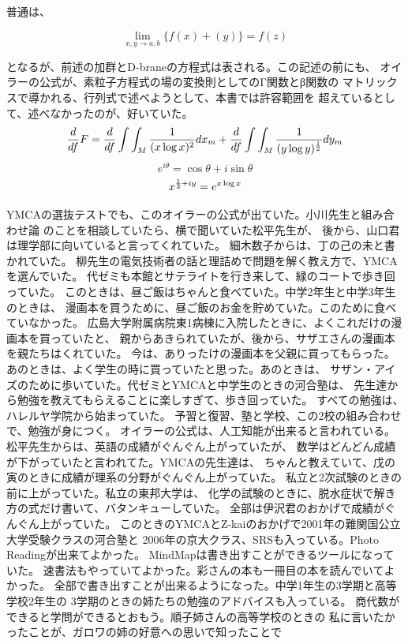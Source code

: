 \documentclass{jsarticle}
\begin{document}
普通は、

$$ \lim_{x,y\to a,b}\{{f(x) + (y)}\} = f(z) $$

となるが、前述の加群とD-braneの方程式は表される。この記述の前にも、
オイラーの公式が、素粒子方程式の場の変換則としてのΓ関数とβ関数の
マトリックスで導かれる、行列式で述べようとして、本書では許容範囲を
超えているとして、述べなかったのが、好いていた。
$$ {d \over df}F = {d \over df}\int\int_M{1 \over (x \log x)^2}dx_m 
+ {d \over df}\int\int_M{1 \over (y \log y)^{1 \over 2}}dy_m $$
$$ e^{i \theta} = \cos \theta + i \sin \theta $$
$$ x^{{1 \over 2} + iy} = e^{x \log x} $$

YMCAの選抜テストでも、このオイラーの公式が出ていた。小川先生と組み合わせ論
のことを相談していたら、横で聞いていた松平先生が、
後から、山口君は理学部に向いていると言ってくれていた。
細木数子からは、丁の己の未と書かれていた。
柳先生の電気技術者の話と理詰めで問題を解く教え方で、YMCAを選んでいた。
代ゼミも本館とサテライトを行き来して、緑のコートで歩き回っていた。
このときは、昼ご飯はちゃんと食べていた。中学2年生と中学3年生のときは、
漫画本を買うために、昼ご飯のお金を貯めていた。このために食べていなかった。
広島大学附属病院東1病棟に入院したときに、よくこれだけの漫画本を買っていたと、
親からあきられていたが、後から、サザエさんの漫画本を親たちはくれていた。
今は、ありったけの漫画本を父親に買ってもらった。
あのときは、よく学生の時に買っていたと思った。あのときは、
サザン・アイズのために歩いていた。代ゼミとYMCAと中学生のときの河合塾は、
先生達から勉強を教えてもらえることに楽しすぎて、歩き回っていた。
すべての勉強は、ハレルヤ学院から始まっていた。
予習と復習、塾と学校、この2校の組み合わせで、勉強が身につく。
オイラーの公式は、人工知能が出来ると言われている。
松平先生からは、英語の成績がぐんぐん上がっていたが、
数学はどんどん成績が下がっていたと言われてた。YMCAの先生達は、
ちゃんと教えていて、戊の寅のときに成績が理系の分野がぐんぐん上がっていた。
私立と2次試験のときの前に上がっていた。私立の東邦大学は、
化学の試験のときに、脱水症状で解き方の式だけ書いて、バタンキューしていた。
全部は伊沢君のおかげで成績がぐんぐん上がっていた。
このときのYMCAとZ-kaiのおかげで2001年の難関国公立大学受験クラスの河合塾と
2006年の京大クラス、SRSも入っている。Photo Readingが出来てよかった。
MindMapは書き出すことができるツールになっていた。
速書法もやっていてよかった。彩さんの本も一冊目の本を読んでいてよかった。
全部で書き出すことが出来るようになった。中学1年生の3学期と高等学校2年生の
3学期のときの姉たちの勉強のアドバイスも入っている。
商代数ができると学問ができるとおもう。順子姉さんの高等学校のときの
私に言いたかったことが、ガロワの姉の好意への思いで知ったことで
\end{document}
